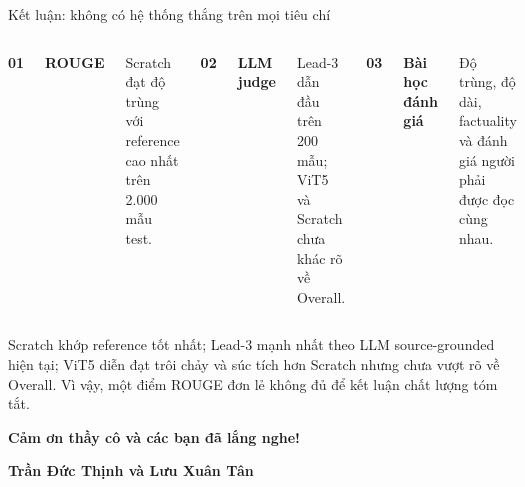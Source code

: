\documentclass[aspectratio=169,10pt]{beamer}
\newcommand{\MemberNames}{Trần Đức Thịnh \quad và \quad Lưu Xuân Tân}
\begin{document}
\begin{frame}{Kết luận: không có hệ thống thắng trên mọi tiêu chí}
  \vspace{0.12cm}
  \begin{columns}[T,onlytextwidth]
      \centering
      {\color{DeepBlue}\Huge\bfseries 01}\par\vspace{1mm}
      {\bfseries ROUGE}\par
      \small Scratch đạt độ trùng với reference cao nhất trên 2.000 mẫu test.

      \centering
      {\color{DeepBlue}\Huge\bfseries 02}\par\vspace{1mm}
      {\bfseries LLM judge}\par
      \small Lead-3 dẫn đầu trên 200 mẫu; ViT5 và Scratch chưa khác rõ về Overall.

      \centering
      {\color{DeepBlue}\Huge\bfseries 03}\par\vspace{1mm}
      {\bfseries Bài học đánh giá}\par
      \small Độ trùng, độ dài, factuality và đánh giá người phải được đọc cùng nhau.
  \end{columns}

  \vspace{0.36cm}
  \begin{keymessage}
    \centering\small
    Scratch khớp reference tốt nhất; Lead-3 mạnh nhất theo LLM source-grounded hiện tại; ViT5 diễn đạt trôi chảy và súc tích hơn Scratch nhưng chưa vượt rõ về Overall. Vì vậy, một điểm ROUGE đơn lẻ không đủ để kết luận chất lượng tóm tắt.
  \end{keymessage}

  \vfill
  \centering
  {\color{DeepBlue}\Large\bfseries Cảm ơn thầy cô và các bạn đã lắng nghe!}\par
  \vspace{1mm}
  {\bfseries \MemberNames}
\end{frame}
\end{document}
